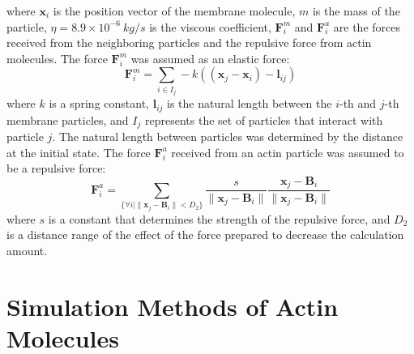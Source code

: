 \documentclass[a4paper,12pt, oneside]{book}
\begin{document}
where  $\bm{x}_i$ is the position vector of the membrane molecule, $m$ is the mass of the particle, $\eta=8.9\times10^{-6}\si{~kg/s}$ is the viscous coefficient, $\bm{F}^m_i$ and $\bm{F}^a_i$ are the forces received from the neighboring particles and  the repulsive force from actin molecules.
The force  $\bm{F}^m_i$ was assumed as an elastic force:
\begin{equation}
\bm{F}^m_i = \sum_{i \in I_j}  -k((\bm{x}_j -\bm{x}_i )-\bm{l}_{ij} )
\end{equation}
where $k$ is a spring constant, $\bm{l}_{ij}$ is the natural length between the $i$-th and $j$-th membrane particles, and $I_j$ represents the set of particles that interact with particle $j$.
The natural length between particles was determined by the distance  at the initial state.
The force $\bm{F}^a_i$ received from an actin particle was assumed to be a  repulsive force:
\begin{equation}
\bm{F}^a_i = \sum_{\{ \forall i | \| \bm{x}_j - \bm{B}_i \|<D_2\}} \frac{s}{\|\bm{x}_j -\bm{B}_i \|} \frac{\bm{x}_j -\bm{B}_i }{\|\bm{x}_j -\bm{B}_i \|}
\end{equation}
where $s$ is a constant that determines the strength of the repulsive force, and $D_2$ is a distance range of the effect of the force prepared to decrease the calculation amount.

\section{Simulation Methods of Actin Molecules}
\end{document}
